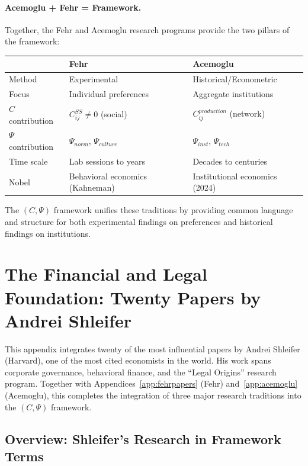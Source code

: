 \documentclass[12pt,a4paper]{article}
\begin{document}
\paragraph{Acemoglu + Fehr = Framework.}
Together, the Fehr and Acemoglu research programs provide the two pillars
of the framework:

\begin{center}
\renewcommand{\arraystretch}{1.2}
\begin{tabular}{lll}
\hline
& \textbf{Fehr} & \textbf{Acemoglu} \\
\hline
Method & Experimental & Historical/Econometric \\
Focus & Individual preferences & Aggregate institutions \\
$C$ contribution & $C^{SS}_{ij} \neq 0$ (social) & $C_{ij}^{production}$ (network) \\
$\Psi$ contribution & $\Psi_{norm}$, $\Psi_{culture}$ & $\Psi_{inst}$, $\Psi_{tech}$ \\
Time scale & Lab sessions to years & Decades to centuries \\
Nobel & Behavioral economics (Kahneman) & Institutional economics (2024) \\
\hline
\end{tabular}
\end{center}

The $(C, \Psi)$ framework unifies these traditions by providing common
language and structure for both experimental findings on preferences
and historical findings on institutions.

\section{The Financial and Legal Foundation: Twenty Papers by Andrei Shleifer}
\label{app:shleifer}

This appendix integrates twenty of the most influential papers by Andrei Shleifer
(Harvard), one of the most cited economists in the world. His work spans
corporate governance, behavioral finance, and the ``Legal Origins'' research
program. Together with Appendices~\ref{app:fehrpapers} (Fehr) and~\ref{app:acemoglu}
(Acemoglu), this completes the integration of three major research traditions
into the $(C, \Psi)$ framework.

\subsection{Overview: Shleifer's Research in Framework Terms}
\end{document}
